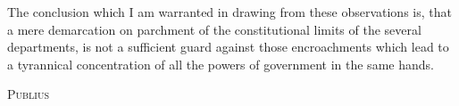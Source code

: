 The conclusion which I am warranted in drawing from these observations is, that a mere demarcation on parchment of the constitutional limits of the several departments, is not a sufficient guard against those encroachments which lead to a tyrannical concentration of all the powers of government in the same hands.

\vspace{.5cm}
\textsc{Publius}

\vspace{1.5cm}

